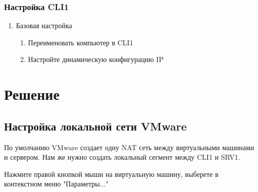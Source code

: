 \documentclass[a4paper, 12pt]{report}
\begin{document}
	\subsubsection{Настройка CLI1}

	\begin{enumerate}
		\item Базовая настройка
		\begin{enumerate}
			\item Переименовать компьютер в CLI1
			\item Настройте динамическую конфигурацию IP
		\end{enumerate}
	\end{enumerate}

	\clearpage
	
	\section{Решение}
	
	\subsection{Настройка локальной сети VMware}
	
	По умолчанию VMware создает одну NAT сеть между виртуальными машинами и сервером. Нам же нужно создать локальный сегмент между CLI1 и SRV1.
	
	Нажмите правой кнопкой мыши на виртуальную машину, выберете в контекстном меню "Параметры..."
	
	\begin{figure}[h]
		\label{fig:image}
	\end{figure}
\end{document}
